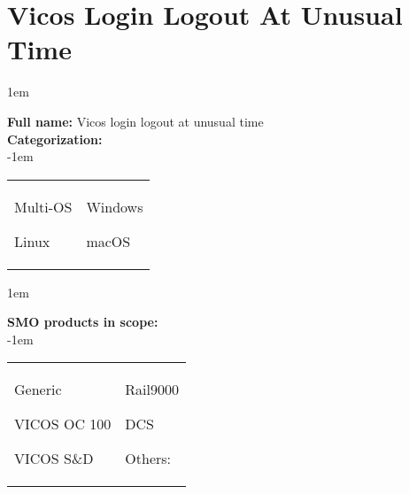 
%
%

\section{Vicos Login Logout At Unusual Time}
\label{15204}

\openup 1em

\textbf{Full name:} Vicos login logout at unusual time\hrulefill \\
{\bf Categorization:} \\

\openup -1em
\vspace{-3em}

\begin{tabular}{p{}p{}}

\begin{todolist}
  	\item Multi-OS
	\item Linux
\end{todolist}
&
\begin{todolist}
	\item[\done] Windows
	\item macOS
\end{todolist}

\end{tabular}

\openup 1em

{\bf SMO products in scope:} \\

\openup -1em
\vspace{-3em}

\begin{tabular}{p{}p{}}

\begin{todolist}
  \item Generic
  \item[\done] VICOS OC 100
  \item VICOS S\&D
\end{todolist}
&
\begin{todolist}
  \item Rail9000
  \item DCS
  \item Others: \hrulefill
\end{todolist}

\end{tabular}

